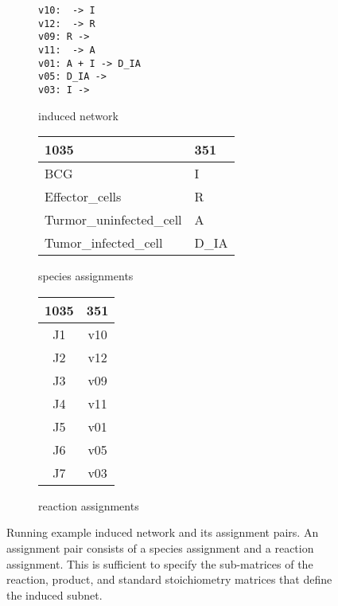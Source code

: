 \documentclass{article}
\begin{document}
\begin{figure}
\centering
\begin{subfigure}{0.25\textwidth}
\begin{framed}
\begin{verbatim}
v10:  -> I
v12:  -> R
v09: R -> 
v11:  -> A
v01: A + I -> D_IA
v05: D_IA -> 
v03: I -> 
\end{verbatim}
\end{framed}
\caption{induced network}
\end{subfigure}
\hfill
\begin{subfigure}{0.4\textwidth}
\begin{tabular}{|l|l|} 
\hline
1035 & 351 \\
\hline\hline
BCG & I \\  
Effector\_cells & R \\
Turmor\_uninfected\_cell & A \\
Tumor\_infected\_cell & D\_IA \\
\hline
\end{tabular}
\caption{species assignments}
\end{subfigure}
\begin{subfigure}{0.3\textwidth}
\begin{tabular}{|c|c|} 
\hline
1035 & 351 \\
\hline\hline
J1 & v10 \\  
J2 & v12 \\
J3 & v09 \\
J4 & v11 \\
J5 & v01 \\
J6 & v05 \\
J7 & v03 \\
\hline
\end{tabular}
\caption{reaction assignments}
\end{subfigure}  
\caption{Running example induced network and its assignment pairs. An assignment pair consists of a species assignment and a reaction assignment. This is sufficient to specify the sub-matrices of the reaction, product, and standard stoichiometry matrices that define the induced subnet.}
\label{fig:figures}
\end{figure}
\end{document}
